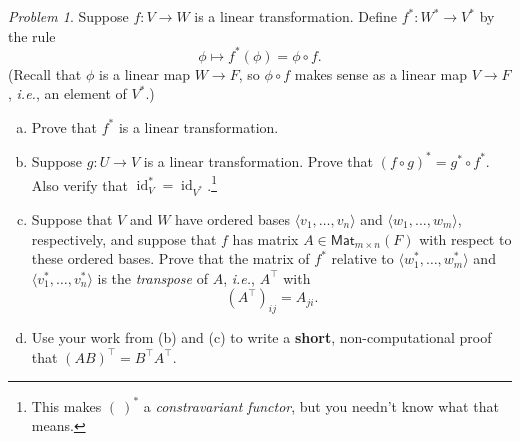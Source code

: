 \documentclass[11pt,twoside]{amsart}
\theoremstyle{plain}
\theoremstyle{remark}
\newtheorem{prob}{Problem}
\theoremstyle{definition}
\theoremstyle{definition}
\newcommand{\id}{\operatorname{id}}
\newcommand{\Mat}{\mathsf{Mat}}
\begin{document}
\begin{prob}
Suppose $f\colon V\to W$ is a linear transformation.  Define $f^*\colon W^*\to V^*$ by the rule
\[
  \phi\longmapsto f^*(\phi) = \phi\circ f.
\]
(Recall that $\phi$ is a linear map $W\to F$, so $\phi\circ f$ makes sense as a linear map $V\to F$, \emph{i.e.}, an element of $V^*$.)
\begin{enumerate}[(a)]
\item Prove that $f^*$ is a linear transformation.
\item Suppose $g\colon U\to V$ is a linear transformation.  Prove that $(f\circ g)^* = g^*\circ f^*$.  Also verify that $\id_V^* = \id_{V^*}$.\footnote{This makes $(~)^*$ a \emph{constravariant functor}, but you needn't know what that means.}
\item Suppose that $V$ and $W$ have ordered bases $\langle v_1,\ldots,v_n\rangle$ and $\langle w_1,\ldots,w_m\rangle$, respectively, and suppose that $f$ has matrix $A\in\Mat_{m\times n}(F)$ with respect to these ordered bases.  Prove that the matrix of $f^*$ relative to $\langle w_1^*,\ldots,w_m^*\rangle$ and $\langle v_1^*,\ldots,v_n^*\rangle$ is the \emph{transpose} of $A$, \emph{i.e.}, $A^\top$ with
\[
  (A^\top)_{ij} = A_{ji}.
\]
\item Use your work from (b) and (c) to write a \textbf{short}, non-computational proof that $(AB)^\top = B^\top A^\top$.
\end{enumerate}
\end{prob}
\end{document}
